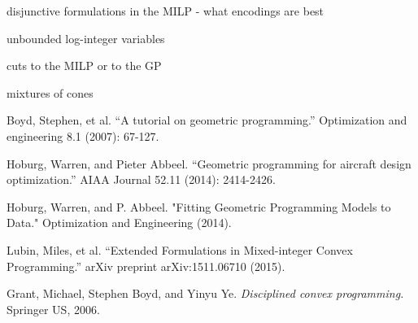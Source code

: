\documentclass[]{article}
\begin{document}
disjunctive formulations in the MILP - what encodings are best

unbounded log-integer variables

cuts to the MILP or to the GP

mixtures of cones













\begin{thebibliography}{9}

Boyd, Stephen, et al. ``A tutorial on geometric programming.'' Optimization and engineering 8.1 (2007): 67-127.

Hoburg, Warren, and Pieter Abbeel. ``Geometric programming for aircraft design optimization.'' AIAA Journal 52.11 (2014): 2414-2426.

Hoburg, Warren, and P. Abbeel. "Fitting Geometric Programming Models to Data." Optimization and Engineering (2014).

Lubin, Miles, et al. ``Extended Formulations in Mixed-integer Convex Programming.'' arXiv preprint arXiv:1511.06710 (2015).

Grant, Michael, Stephen Boyd, and Yinyu Ye. \textit{Disciplined convex programming.} Springer US, 2006.

\end{thebibliography}
\end{document}
